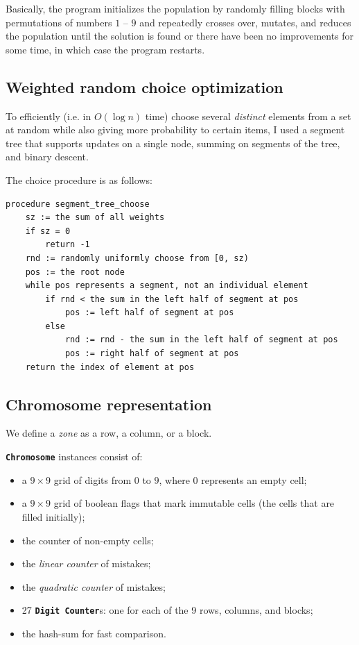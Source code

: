 \documentclass[10pt]{article}
\begin{document}
Basically, the program initializes the population by randomly filling blocks
with permutations of numbers $1$ -- $9$ and repeatedly crosses over, mutates,
and reduces the population until the solution is found or there have been no
improvements for some time, in which case the program restarts.

\subsection{Weighted random choice optimization}
To efficiently (i.e. in $O(\log n)$ time) choose several \textit{distinct} elements from a set at random while also
giving more probability to certain items, I used a segment tree that supports
updates on a single node, summing on segments of the tree, and binary descent.

The choice procedure is as follows:

\begin{lstlisting}[language=pseu, style=lststyle]
procedure segment_tree_choose
    sz := the sum of all weights
    if sz = 0
        return -1
    rnd := randomly uniformly choose from [0, sz)
    pos := the root node
    while pos represents a segment, not an individual element
        if rnd < the sum in the left half of segment at pos
            pos := left half of segment at pos
        else
            rnd := rnd - the sum in the left half of segment at pos
            pos := right half of segment at pos
    return the index of element at pos
\end{lstlisting}

\subsection{Chromosome representation}\label{repr}

We define a \textit{zone} as a row, a column, or a block.

\textbf{\texttt{Chromosome}} instances consist of:

\begin{itemize}
    \item a $9\times9$ grid of digits from $0$ to $9$, where $0$ represents an
        empty cell;
    \item a $9\times9$ grid of boolean flags that mark immutable cells (the cells
        that are filled initially);
    \item the counter of non-empty cells;
    \item the \textit{linear counter} of mistakes;
    \item the \textit{quadratic counter} of mistakes;
    \item 27 \textbf{\texttt{Digit Counter}}s: one for each of the 9 rows, columns, and blocks;
    \item the hash-sum for fast comparison.
\end{itemize}
\end{document}
